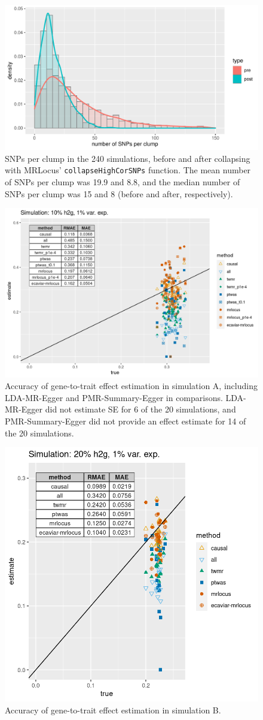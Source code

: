 \documentclass[11pt]{article}
\begin{document}
\begin{figure}[!ht]
  \centering
  \includegraphics[width=.7\textwidth]{figs/snps_per_clump}
  \caption{SNPs per clump in the 240 simulations, before and after
    collapsing with MRLocus’ \texttt{collapseHighCorSNPs}
    function. The mean number of SNPs per clump was 19.9 and 8.8, and
    the median number of SNPs per clump was 15 and 8 (before and
    after, respectively).}
\end{figure}

\begin{figure}[!ht]
  \centering
  \includegraphics[width=.7\textwidth]{figs/sim1extra.png}
  \caption{Accuracy of gene-to-trait effect estimation in simulation
    A, including LDA-MR-Egger and PMR-Summary-Egger in
    comparisons. LDA-MR-Egger did not estimate SE for 6 of the 20
    simulations, and PMR-Summary-Egger did not provide an effect
    estimate for 14 of the 20 simulations.}
\end{figure}

\begin{figure}[!ht]
  \centering
  \includegraphics[width=.6\textwidth]{figs/sim3.png}
  \caption{Accuracy of gene-to-trait effect estimation in simulation B.}
\end{figure}
\end{document}

